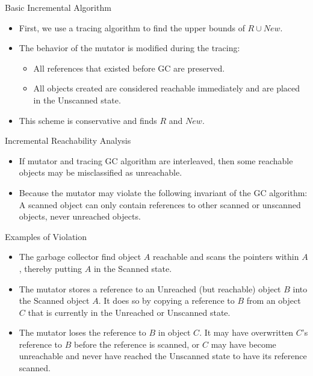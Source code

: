\begin{bibunit}[apalike]
\begin{frame}{Basic Incremental Algorithm}
	\begin{itemize}
	\item First, we use a tracing algorithm to find the upper bounds of $R \cup New$. 
	\item The behavior of the mutator is modified during the tracing:
		\begin{itemize}
		\item All references that existed before GC are preserved.
		\item All objects created are considered reachable immediately and are placed in the Unscanned state.
		\end{itemize}
	\item This scheme is conservative and finds $R$ and $New$.
	\end{itemize}
	\vfill
	\vfill
\end{frame}

\begin{frame}{Incremental Reachability Analysis}
	\begin{itemize}
	\item If mutator and tracing GC algorithm are interleaved, then some reachable objects may be misclassified as unreachable.
	\vfill
	\item Because the mutator may violate the following invariant of the GC algorithm: \\
		A scanned object can only contain references to other scanned or unscanned objects, never unreached objects.
	\end{itemize}
\end{frame}

\begin{frame}[t]{Examples of Violation}
	\begin{small}
	\begin{itemize}
	\item<1> The garbage collector find object $A$ reachable and scans the pointers within $A$, thereby putting $A$ in the Scanned state.
	\item<2> The mutator stores a reference to an Unreached (but reachable) object $B$ into the Scanned object $A$. It does so by copying a reference to $B$ from an object $C$ that is currently in the Unreached or Unscanned state.
	\item<3> The mutator loses the reference to $B$ in object $C$. It may have overwritten $C$'s reference to $B$ before the reference is scanned, or $C$ may have become unreachable and never have reached the Unscanned state to have its reference scanned.
	\end{itemize}
	\end{small}
	\vfill
	\begin{center}
	\end{center}
\end{frame}


\end{bibunit}
